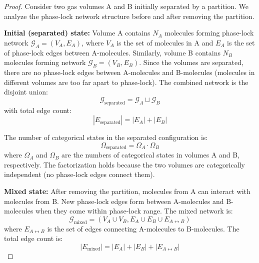 \documentclass[12pt,a4paper]{article}
\theoremstyle{definition}
\theoremstyle{remark}
\newcommand{\phaselockgraph}{\mathcal{G}}
\begin{document}
\begin{proof}
Consider two gas volumes A and B initially separated by a partition. We analyze the phase-lock network structure before and after removing the partition.

\textbf{Initial (separated) state:}
Volume A contains $N_A$ molecules forming phase-lock network $\phaselockgraph_A = (V_A, E_A)$, where $V_A$ is the set of molecules in A and $E_A$ is the set of phase-lock edges between A-molecules. Similarly, volume B contains $N_B$ molecules forming network $\phaselockgraph_B = (V_B, E_B)$. Since the volumes are separated, there are no phase-lock edges between A-molecules and B-molecules (molecules in different volumes are too far apart to phase-lock). The combined network is the disjoint union:
\begin{equation}
\phaselockgraph_{\text{separated}} = \phaselockgraph_A \sqcup \phaselockgraph_B
\end{equation}
with total edge count:
\begin{equation}
|E_{\text{separated}}| = |E_A| + |E_B|
\end{equation}

The number of categorical states in the separated configuration is:
\begin{equation}
\Omega_{\text{separated}} = \Omega_A \cdot \Omega_B
\end{equation}
where $\Omega_A$ and $\Omega_B$ are the numbers of categorical states in volumes A and B, respectively. The factorization holds because the two volumes are categorically independent (no phase-lock edges connect them).

\textbf{Mixed state:}
After removing the partition, molecules from A can interact with molecules from B. New phase-lock edges form between A-molecules and B-molecules when they come within phase-lock range. The mixed network is:
\begin{equation}
\phaselockgraph_{\text{mixed}} = (V_A \cup V_B, E_A \cup E_B \cup E_{A \leftrightarrow B})
\end{equation}
where $E_{A \leftrightarrow B}$ is the set of edges connecting A-molecules to B-molecules. The total edge count is:
\begin{equation}
|E_{\text{mixed}}| = |E_A| + |E_B| + |E_{A \leftrightarrow B}|
\end{equation}


\end{proof}
\end{document}
